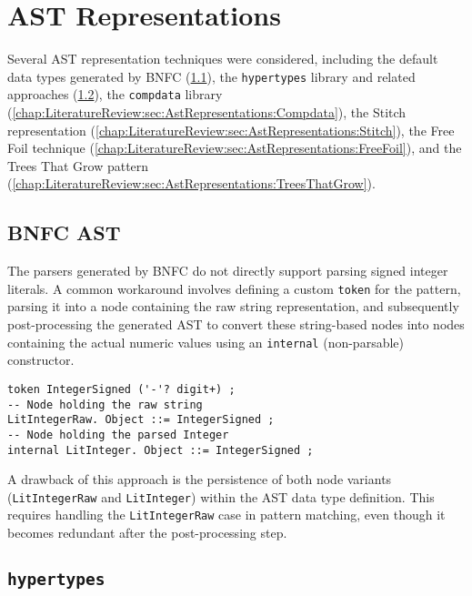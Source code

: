\section{AST Representations}
\label{sec:AstRepresentations}

Several AST representation techniques were considered, including the default data types generated by BNFC (\cref{chap:LiteratureReview:sec:AstRepresentations:BnfcAst}), the \texttt{hypertypes} library and related approaches (\cref{chap:LiteratureReview:sec:AstRepresentations:Hypertypes}), the \texttt{compdata} library (\cref{chap:LiteratureReview:sec:AstRepresentations:Compdata}), the Stitch representation (\cref{chap:LiteratureReview:sec:AstRepresentations:Stitch}), the Free Foil technique (\cref{chap:LiteratureReview:sec:AstRepresentations:FreeFoil}), and the Trees That Grow pattern (\cref{chap:LiteratureReview:sec:AstRepresentations:TreesThatGrow}).


\subsection{BNFC AST}
\label{chap:LiteratureReview:sec:AstRepresentations:BnfcAst}

The parsers generated by BNFC do not directly support parsing signed integer literals. A common workaround involves defining a custom \texttt{token} for the pattern, parsing it into a node containing the raw string representation, and subsequently post-processing the generated AST to convert these string-based nodes into nodes containing the actual numeric values using an \texttt{internal} (non-parsable) constructor.

\begin{verbatim}
token IntegerSigned ('-'? digit+) ;
-- Node holding the raw string
LitIntegerRaw. Object ::= IntegerSigned ;
-- Node holding the parsed Integer
internal LitInteger. Object ::= IntegerSigned ;
\end{verbatim}

A drawback of this approach is the persistence of both node variants (\texttt{LitIntegerRaw} and \texttt{LitInteger}) within the AST data type definition. This requires handling the \texttt{LitIntegerRaw} case in pattern matching, even though it becomes redundant after the post-processing step.

\subsection{\texttt{hypertypes}}
\label{chap:LiteratureReview:sec:AstRepresentations:Hypertypes}

